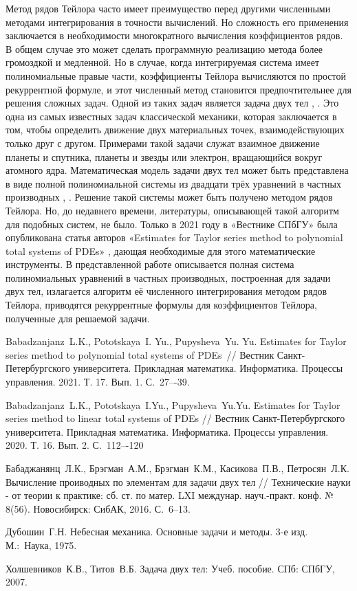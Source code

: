 Метод рядов Тейлора часто имеет преимущество перед другими численными методами интегрирования в точности вычислений. Но сложность его применения заключается в необходимости многократного вычисления коэффициентов рядов. В общем случае это может сделать программную реализацию метода более громоздкой и медленной. Но в случае, когда интегрируемая система имеет полиномиальные правые части, коэффициенты Тейлора вычисляются по простой рекуррентной формуле, и этот численный метод становится предпочтительнее для решения сложных задач.
Одной из таких задач является задача двух тел \cite{1975}, \cite{2007}.  Это одна из самых известных задач классической механики, которая заключается в том, чтобы определить движение двух материальных точек, взаимодействующих только друг с другом. Примерами такой задачи служат взаимное движение планеты и спутника, планеты и звезды или электрон, вращающийся вокруг атомного ядра. Математическая модель задачи двух тел может быть представлена в виде полной полиномиальной системы  из двадцати трёх уравнений в частных производных \cite{2016}, \cite{2020}. Решение такой системы может быть получено методом рядов Тейлора. Но, до недавнего времени, литературы, описывающей такой алгоритм для подобных систем, не было. Только в 2021 году в «Вестнике СПбГУ» была опубликована статья авторов «Estimates for Taylor series method to polynomial total systems of PDEs» \cite{2021}, дающая необходимые для этого математические инструменты.
В представленной работе описывается полная система полиномиальных уравнений в частных производных, построенная для задачи двух тел, излагается алгоритм её численного интегрирования методом рядов Тейлора, приводятся рекуррентные формулы для коэффициентов Тейлора, полученные для решаемой задачи.



\begin{thebibliography}{9} %



 Babadzanjanz~L.K., Pototskaya~I. Yu., Pupysheva~Yu. Yu. Estimates for
Taylor series method to polynomial total systems of PDEs~// Вестник Санкт-Петербургского
университета. Прикладная математика. Информатика. Процессы управления. 2021. Т. 17.
Вып. 1. С.~27–-39.

 Babadzanjanz~L.K., Pototskaya~I.Yu., Pupysheva~Yu.Yu. Estimates
for Taylor series method to linear total systems of PDEs // Вестник Санкт-Петербургского
университета. Прикладная математика. Информатика. Процессы управления. 2020. Т. 16.
Вып. 2. С.~112–-120

 Бабаджанянц~Л.К., Брэгман~А.М., Брэгман~К.М., Касикова~П.В., Петросян~Л.К. Вычисление проиводных по элементам для задачи двух тел // Технические науки - от теории к практике: сб. ст. по матер. LXI междунар. науч.-практ. конф. № 8(56). Новосибирск: СибАК, 2016. С.~6--13.
    
 Дубошин~Г.Н. Небесная механика. Основные задачи и методы. 3-е изд. М.:~Наука, 1975.

 Холшевников~К.В., Титов~В.Б. Задача двух тел: Учеб. пособие. СПб: СПбГУ, 2007.


\end{thebibliography}





% 